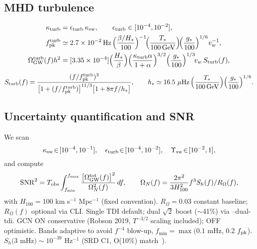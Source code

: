\documentclass[preprint,aps,prd,onecolumn,nofootinbib,longbibliography]{revtex4-2}
\numberwithin{equation}{section}
\begin{document}
\subsection{MHD turbulence}
\label{sec:turb}
\begin{align}
\kappa_{\mathrm{turb}} &= \epsilon_{\mathrm{turb}}\,\kappa_{\mathrm{sw}},\qquad \epsilon_{\mathrm{turb}}\in[10^{-4},10^{-2}],\\
f_{\rm pk}^{\rm turb} &\simeq 2.7\times10^{-2}\,\mathrm{Hz}\,
\Big(\frac{\beta/H_*}{100}\Big)^{-1}\!
\Big(\frac{T_*}{100\,\mathrm{GeV}}\Big)\!
\Big(\frac{g_*}{100}\Big)^{1/6} v_w^{-1},\\
\Omega_{\mathrm{GW}}^{\mathrm{turb}}(f)h^2 &= [3.35\times10^{-4}]
\Big(\frac{H_*}{\beta}\Big)
\Big(\frac{\kappa_{\mathrm{turb}}\alpha}{1+\alpha}\Big)^{3/2}
\Big(\frac{g_*}{100}\Big)^{1/3}\! v_w\, S_{\mathrm{turb}}(f),
\end{align}
\begin{equation}
S_{\mathrm{turb}}(f)=\frac{(f/f_{\rm pk}^{\rm turb})^3}{\big[1+(f/f_{\rm pk}^{\rm turb})\big]^{11/3}\big[1+8\pi f/h_*\big]},\qquad
h_*\simeq 16.5~\mu\mathrm{Hz}\,\Big(\frac{T_*}{100\,\mathrm{GeV}}\Big)\Big(\frac{g_*}{100}\Big)^{1/6}.
\end{equation}

\subsection{Uncertainty quantification and SNR}
\label{sec:uq}
We scan
\begin{equation}
\kappa_{\rm sw}\!\in\![10^{-4},10^{-1}],\quad
\epsilon_{\rm turb}\!\in\![10^{-4},10^{-2}],\quad
\Upsilon_{\rm sw}\!\in\![10^{-2},1],
\end{equation}
and compute
\begin{equation}
\mathrm{SNR}^2= T_{\rm obs}\int_{f_{\min}}^{f_{\max}} \frac{\big[\Omega_{\rm GW}^{\rm tot}(f)\big]^2}{\Omega_N^2(f)}\,df,\qquad
\Omega_N(f)=\frac{2\pi^2}{3H_{100}^2}f^3 S_h(f)/R_\Omega(f),
\label{eq:snr_def}
\end{equation}
with $H_{100}=100$ km s$^{-1}$ Mpc$^{-1}$ (fixed convention). $R_\Omega=0.03$ constant baseline; $R_\Omega(f)$ optional via CLI. Single TDI default; dual $\sqrt{2}$ boost ($\sim$41\%) via --dual-tdi. GCN ON conservative (Robson 2019, $T^{-3/2}$ scaling included); OFF optimistic. Bands adaptive to avoid $f^{-4}$ blow-up, $f_{\min}=\max(0.1$ mHz, 0.2 $f_{\rm pk}$). $S_h(3$ mHz$) \sim 10^{-39}$ Hz$^{-1}$ (SRD C1, O(10\%) match~\cite{Amaro2017}).
\end{document}
